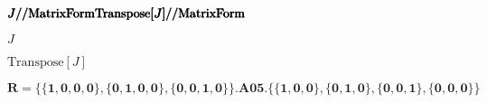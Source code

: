 \documentclass{article}
\begin{document}
\begin{doublespace}
\noindent\(\pmb{J\text{//}\text{MatrixForm}}\\
\pmb{\text{Transpose}[J]\text{//}\text{MatrixForm}}\)
\end{doublespace}

\begin{doublespace}
\noindent\(J\)
\end{doublespace}

\begin{doublespace}
\noindent\(\text{Transpose}[J]\)
\end{doublespace}

\begin{doublespace}
\noindent\(\pmb{R=\{\{1,0,0,0\},\{0 ,1,0,0\},\{0 ,0,1,0\}\}.\text{A05}.\{\{1,0,0\},\{0,1,0\},\{0,0,1\},\{0,0,0\}\}}\)
\end{doublespace}
\end{document}
